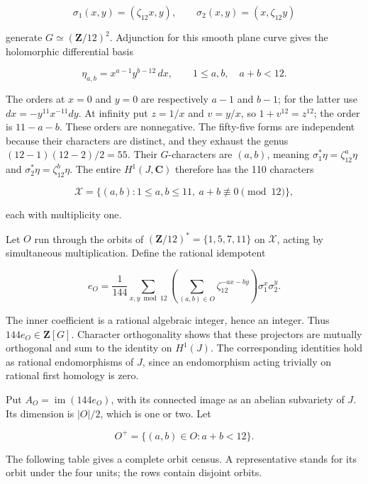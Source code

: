 \[
 \sigma_1(x,y)=(\zeta_{12}x,y),\qquad
 \sigma_2(x,y)=(x,\zeta_{12}y)
\]

generate \(G\simeq(\mathbf Z/12)^2\). Adjunction for this smooth plane
curve gives the holomorphic differential basis

\[
 \eta_{a,b}=x^{a-1}y^{b-12}\,dx,\qquad
 1\le a,b,\quad a+b<12.
 \tag{F12.4}
\]

The orders at \(x=0\) and \(y=0\) are respectively \(a-1\) and \(b-1\);
for the latter use \(dx=-y^{11}x^{-11}dy\). At infinity put \(z=1/x\)
and \(v=y/x\), so \(1+v^{12}=z^{12}\); the order is \(11-a-b\). These
orders are nonnegative. The fifty-five forms are independent because
their characters are distinct, and they exhaust the genus
\((12-1)(12-2)/2=55\). Their \(G\)-characters are \((a,b)\), meaning
\(\sigma_1^*\eta=\zeta_{12}^a\eta\) and
\(\sigma_2^*\eta=\zeta_{12}^b\eta\). The entire \(H^1(J,\mathbf C)\)
therefore has the 110 characters

\[
 \mathcal X=\{(a,b):1\le a,b\le11,\ a+b\not\equiv0\pmod{12}\},
\]

each with multiplicity one.

Let \(O\) run through the orbits of \((\mathbf Z/12)^*=\{1,5,7,11\}\) on
\(\mathcal X\), acting by simultaneous multiplication. Define the
rational idempotent

\[
 e_O=\frac1{144}\sum_{x,y\bmod12}
       \left(\sum_{(a,b)\in O}\zeta_{12}^{-ax-by}\right)
       \sigma_1^x\sigma_2^y.
 \tag{F12.5}
\]

The inner coefficient is a rational algebraic integer, hence an integer.
Thus \(144e_O\in\mathbf Z[G]\). Character orthogonality shows that these
projectors are mutually orthogonal and sum to the identity on
\(H^1(J)\). The corresponding identities hold as rational endomorphisms
of \(J\), since an endomorphism acting trivially on rational first
homology is zero.

Put \(A_O=\operatorname{im}(144e_O)\), with its connected image as an
abelian subvariety of \(J\). Its dimension is \(|O|/2\), which is one or
two. Let

\[
 O^+=\{(a,b)\in O:a+b<12\}.
\]

The following table gives a complete orbit census. A representative
stands for its orbit under the four units; the rows contain disjoint
orbits.

